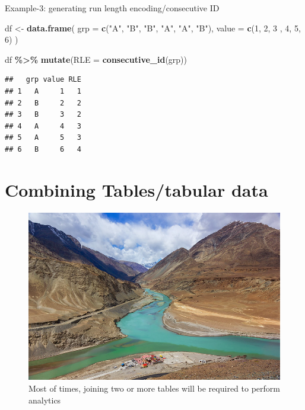 \documentclass[
]{book}
\newenvironment{Shaded}{\begin{snugshade}}{\end{snugshade}}
\newcommand{\AttributeTok}[1]{\textcolor[rgb]{0.13,0.29,0.53}{#1}}
\newcommand{\DecValTok}[1]{\textcolor[rgb]{0.00,0.00,0.81}{#1}}
\newcommand{\FunctionTok}[1]{\textcolor[rgb]{0.13,0.29,0.53}{\textbf{#1}}}
\newcommand{\NormalTok}[1]{#1}
\newcommand{\OtherTok}[1]{\textcolor[rgb]{0.56,0.35,0.01}{#1}}
\newcommand{\SpecialCharTok}[1]{\textcolor[rgb]{0.81,0.36,0.00}{\textbf{#1}}}
\newcommand{\StringTok}[1]{\textcolor[rgb]{0.31,0.60,0.02}{#1}}
\begin{document}
Example-3: generating run length encoding/consecutive ID

\begin{Shaded}
\begin{Highlighting}[]
\NormalTok{df }\OtherTok{\textless{}{-}} \FunctionTok{data.frame}\NormalTok{(}
  \AttributeTok{grp =} \FunctionTok{c}\NormalTok{(}\StringTok{"A"}\NormalTok{, }\StringTok{"B"}\NormalTok{, }\StringTok{"B"}\NormalTok{, }\StringTok{"A"}\NormalTok{, }\StringTok{"A"}\NormalTok{, }\StringTok{"B"}\NormalTok{),}
  \AttributeTok{value =} \FunctionTok{c}\NormalTok{(}\DecValTok{1}\NormalTok{, }\DecValTok{2}\NormalTok{, }\DecValTok{3}\NormalTok{ , }\DecValTok{4}\NormalTok{, }\DecValTok{5}\NormalTok{, }\DecValTok{6}\NormalTok{)}
\NormalTok{)}

\NormalTok{df }\SpecialCharTok{\%\textgreater{}\%} 
  \FunctionTok{mutate}\NormalTok{(}\AttributeTok{RLE =} \FunctionTok{consecutive\_id}\NormalTok{(grp))}
\end{Highlighting}
\end{Shaded}

\begin{verbatim}
##   grp value RLE
## 1   A     1   1
## 2   B     2   2
## 3   B     3   2
## 4   A     4   3
## 5   A     5   3
## 6   B     6   4
\end{verbatim}

\hypertarget{combining-tablestabular-data}{%
\chapter{Combining Tables/tabular data}\label{combining-tablestabular-data}}

\begin{figure}

{\centering \includegraphics[width=0.75\linewidth,height=0.75\textheight]{images/conf} 

}

\caption{Most of times, joining two or more tables will be required to perform analytics}\label{fig:unnamed-chunk-263}
\end{figure}
\end{document}
